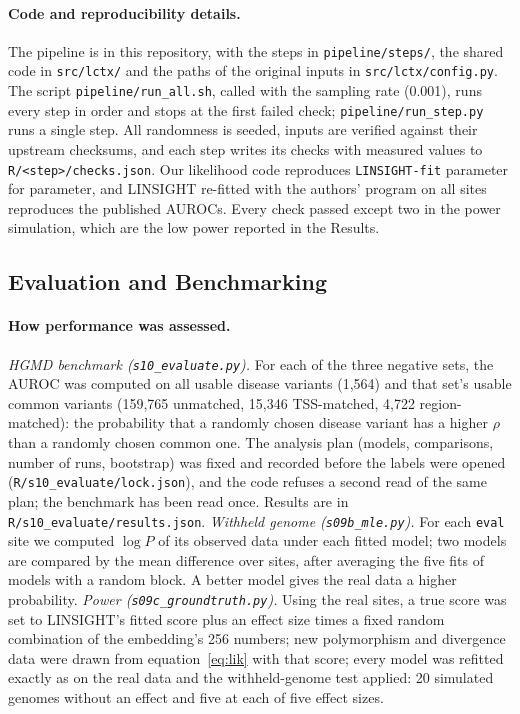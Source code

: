 \documentclass[11pt]{article}
\newcommand{\file}[1]{\nolinkurl{#1}}
\begin{document}
\paragraph{Code and reproducibility details.} The pipeline is in this repository, with the steps in
\file{pipeline/steps/}, the shared code in \file{src/lctx/} and the paths of the original inputs in
\file{src/lctx/config.py}. The script \file{pipeline/run_all.sh}, called with the sampling rate (0.001), runs every step in
order and stops at the first failed check; \file{pipeline/run_step.py} runs a single step. All
randomness is seeded, inputs are verified against their upstream checksums, and each step writes its checks
with measured values to \file{R/<step>/checks.json}. Our likelihood code reproduces \file{LINSIGHT-fit}
parameter for parameter, and LINSIGHT re-fitted with the authors' program on all sites reproduces the
published AUROCs. Every check passed except two in the power simulation, which are the low power reported in
the Results.

\subsection*{Evaluation and Benchmarking}
\paragraph{How performance was assessed.} \emph{HGMD benchmark (\file{s10_evaluate.py}).} For each of the
three negative sets, the AUROC was computed on all usable disease variants (1,564) and that set's usable
common variants (159,765 unmatched, 15,346 TSS-matched, 4,722 region-matched): the probability that a
randomly chosen disease variant has a higher $\rho$ than a randomly chosen common one. The
analysis plan (models, comparisons, number of runs, bootstrap) was fixed and recorded before the labels were
opened (\file{R/s10_evaluate/lock.json}), and the code refuses a second read of the same plan; the benchmark
has been read once. Results are in \file{R/s10_evaluate/results.json}. \emph{Withheld genome
(\file{s09b_mle.py}).} For each \texttt{eval} site we computed $\log P$ of its observed data under each fitted
model; two models are compared by the mean difference over sites, after averaging the five fits of models
with a random block. A better model gives the real data a higher probability. \emph{Power
(\file{s09c_groundtruth.py}).} Using the real sites, a true score was set to LINSIGHT's fitted score plus an
effect size times a fixed random combination of the embedding's 256 numbers; new polymorphism and divergence
data were drawn from equation~\ref{eq:lik} with that score; every model was refitted exactly as on the real
data and the withheld-genome test applied: 20 simulated genomes without an effect and five at each of five
effect sizes.
\end{document}

